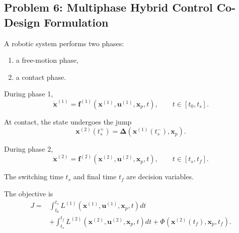 \subsection*{Problem 6: Multiphase Hybrid Control Co-Design Formulation}

A robotic system performs two phases:

\begin{enumerate}
    \item a free-motion phase,
    \item a contact phase.
\end{enumerate}

During phase 1,
\begin{equation}
\dot{\mathbf{x}}^{(1)}
=
\mathbf{f}^{(1)}
\left(
\mathbf{x}^{(1)},
\mathbf{u}^{(1)},
\mathbf{x}_p,
t
\right),
\qquad
t\in[t_0,t_s].
\end{equation}

At contact, the state undergoes the jump
\begin{equation}
\mathbf{x}^{(2)}(t_s^+)
=
\boldsymbol{\Delta}
\left(
\mathbf{x}^{(1)}(t_s^-),
\mathbf{x}_p
\right).
\end{equation}

During phase 2,
\begin{equation}
\dot{\mathbf{x}}^{(2)}
=
\mathbf{f}^{(2)}
\left(
\mathbf{x}^{(2)},
\mathbf{u}^{(2)},
\mathbf{x}_p,
t
\right),
\qquad
t\in[t_s,t_f].
\end{equation}

The switching time $t_s$ and final time $t_f$ are decision variables.

The objective is
\begin{align}
J
=&
\int_{t_0}^{t_s}
L^{(1)}
\left(
\mathbf{x}^{(1)},
\mathbf{u}^{(1)},
\mathbf{x}_p,
t
\right)dt
\nonumber\\
&+
\int_{t_s}^{t_f}
L^{(2)}
\left(
\mathbf{x}^{(2)},
\mathbf{u}^{(2)},
\mathbf{x}_p,
t
\right)dt
+
\Phi
\left(
\mathbf{x}^{(2)}(t_f),
\mathbf{x}_p,
t_f
\right).
\end{align}

